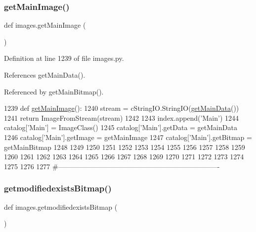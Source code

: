 \subsubsection{\texorpdfstring{get\+Main\+Image()}{getMainImage()}}
{\footnotesize\ttfamily def images.\+get\+Main\+Image (\begin{DoxyParamCaption}{ }\end{DoxyParamCaption})}



Definition at line 1239 of file images.\+py.



References get\+Main\+Data().



Referenced by get\+Main\+Bitmap().


\begin{DoxyCode}
1239 \textcolor{keyword}{def }\hyperlink{namespaceimages_a64d996854da6403c27adf405ded8ec7e}{getMainImage}():
1240     stream = cStringIO.StringIO(\hyperlink{namespaceimages_a67ab05f76d8ee82ee207e9313f1452b1}{getMainData}())
1241     \textcolor{keywordflow}{return} ImageFromStream(stream)
1242 
1243 index.append(\textcolor{stringliteral}{'Main'})
1244 catalog[\textcolor{stringliteral}{'Main'}] = ImageClass()
1245 catalog[\textcolor{stringliteral}{'Main'}].getData = getMainData
1246 catalog[\textcolor{stringliteral}{'Main'}].getImage = getMainImage
1247 catalog[\textcolor{stringliteral}{'Main'}].getBitmap = getMainBitmap
1248 
1249 
1250 
1251 
1252 
1253 
1254 
1255 
1256 
1257 
1258 
1259 
1260 
1261 
1262 
1263 
1264 
1265 
1266 
1267 
1268 
1269 
1270 
1271 
1272 
1273 
1274 
1275 
1276 
1277 \textcolor{comment}{#----------------------------------------------------------------------}
\end{DoxyCode}
\mbox{\label{namespaceimages_afba6dcd82696865e7718eb113495e9f5}} 
\subsubsection{\texorpdfstring{getmodifiedexists\+Bitmap()}{getmodifiedexistsBitmap()}}
{\footnotesize\ttfamily def images.\+getmodifiedexists\+Bitmap (\begin{DoxyParamCaption}{ }\end{DoxyParamCaption})}




